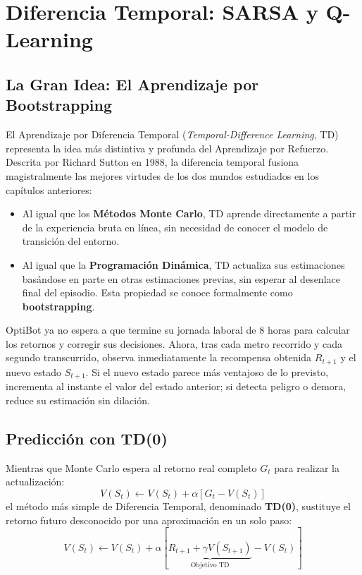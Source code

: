 \chapter{Diferencia Temporal: SARSA y Q-Learning}
\label{cap:td}

\section{La Gran Idea: El Aprendizaje por Bootstrapping}
El Aprendizaje por Diferencia Temporal (\textit{Temporal-Difference Learning}, TD) representa la idea más distintiva y profunda del Aprendizaje por Refuerzo. Descrita por Richard Sutton en 1988, la diferencia temporal fusiona magistralmente las mejores virtudes de los dos mundos estudiados en los capítulos anteriores:
\begin{itemize}
  \item Al igual que los \textbf{Métodos Monte Carlo}, TD aprende directamente a partir de la experiencia bruta en línea, sin necesidad de conocer el modelo de transición del entorno.
  \item Al igual que la \textbf{Programación Dinámica}, TD actualiza sus estimaciones basándose en parte en otras estimaciones previas, sin esperar al desenlace final del episodio. Esta propiedad se conoce formalmente como \textbf{bootstrapping}.
\end{itemize}

\begin{optibot}
OptiBot ya no espera a que termine su jornada laboral de 8 horas para calcular los retornos y corregir sus decisiones. Ahora, tras cada metro recorrido y cada segundo transcurrido, observa inmediatamente la recompensa obtenida $R_{t+1}$ y el nuevo estado $S_{t+1}$. Si el nuevo estado parece más ventajoso de lo previsto, incrementa al instante el valor del estado anterior; si detecta peligro o demora, reduce su estimación sin dilación.
\end{optibot}

\section{Predicción con TD(0)}
Mientras que Monte Carlo espera al retorno real completo $G_t$ para realizar la actualización:
\[
  V(S_t) \leftarrow V(S_t) + \alpha \left[ G_t - V(S_t) \right]
\]
el método más simple de Diferencia Temporal, denominado \textbf{TD(0)}, sustituye el retorno futuro desconocido por una aproximación en un solo paso:
\begin{equation}
  V(S_t) \leftarrow V(S_t) + \alpha \left[ \underbrace{R_{t+1} + \gamma V(S_{t+1})}_{\text{Objetivo TD}} - V(S_t) \right]
\end{equation}

